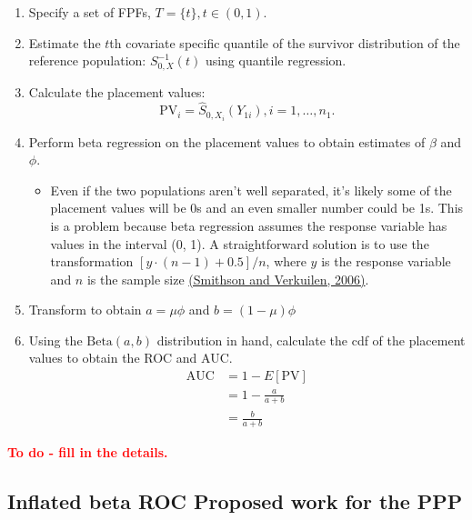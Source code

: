 \documentclass{article}
\newcommand{\be}{\beta}
\begin{document}
\begin{enumerate}
    \item Specify a set of FPFs, $T = \{t\}, t \in (0,1)$.
    \item Estimate the $t$th covariate specific quantile of the survivor distribution of the reference population: $S_{0, X}^{-1}(t)$ using quantile regression.
    \item Calculate the placement values:
    $$\text{PV}_i = \hat{S}_{0, X_i}(Y_{1i}), i = 1, \dots, n_1.$$
    \item Perform beta regression on the placement values to obtain estimates of $\be$ and $\phi$.
    \begin{itemize}
        \item Even if the two populations aren't well separated, it's likely some of the placement values will be 0s and an even smaller number could be 1s. This is a problem because beta regression assumes the response variable has values in the interval (0, 1). A straightforward solution is to use the transformation $[y \cdot (n - 1) + 0.5]/n$, where $y$ is the response variable and $n$ is the sample size \href{https://pdfs.semanticscholar.org/8517/79099a662b91c8153a9a40e069f0276eecbc.pdf}{(Smithson and Verkuilen, 2006)}.
    \end{itemize}
    \item Transform to obtain $a = \mu \phi$ and $b = (1 - \mu)\phi$
    \item Using the $\text{Beta}(a,b)$ distribution in hand, calculate the cdf of the placement values to obtain the ROC and AUC.
    \begin{align*}
        \text{AUC} &= 1 - E[\text{PV}] \\
            &= 1 - \frac{a}{a + b} \\
            &= \frac{b}{a+b}
    \end{align*}
\end{enumerate}

\textcolor{red}{\textbf{To do - fill in the details.}}

\subsection{Inflated beta ROC {\color{blue} Proposed work for the PPP}}
\end{document}
